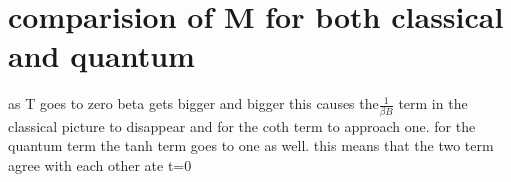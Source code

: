 \documentclass{article}
\begin{document}
\section{comparision of M for both classical and quantum}
as T goes to zero beta gets bigger and bigger this causes the$ \frac{1}{\beta B}$ term in the classical picture to disappear and for the coth term to approach one. for the quantum term the tanh term goes to one as well. this means that the two term agree with each other ate t=0
\end{document}
